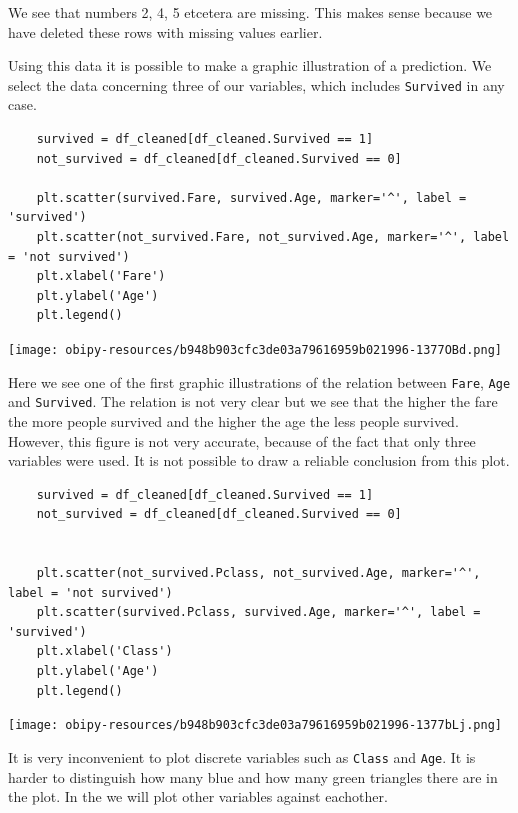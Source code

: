 \documentclass[11pt]{article}
\begin{document}
We see that numbers 2, 4, 5 etcetera are missing. This makes sense because we have deleted these rows with missing values earlier. 

Using this data it is possible to make a graphic illustration of a prediction. We select the data concerning three of our variables, which includes \texttt{Survived} in any case. 


\begin{verbatim}
    survived = df_cleaned[df_cleaned.Survived == 1]
    not_survived = df_cleaned[df_cleaned.Survived == 0]

    plt.scatter(survived.Fare, survived.Age, marker='^', label = 'survived')
    plt.scatter(not_survived.Fare, not_survived.Age, marker='^', label = 'not survived')
    plt.xlabel('Fare')
    plt.ylabel('Age')
    plt.legend()
\end{verbatim}

\begin{center}
\texttt{[image: obipy-resources/b948b903cfc3de03a79616959b021996-1377OBd.png]}
\end{center}

Here we see one of the first graphic illustrations of the relation between \texttt{Fare}, \texttt{Age}
and \texttt{Survived}. The relation is not very clear but we see that the higher the fare the more people survived and the higher the age the less people survived. However, this figure is not very accurate, because of the fact that only three variables were used. It is not possible to draw a reliable conclusion from this plot.



\begin{verbatim}
    survived = df_cleaned[df_cleaned.Survived == 1]
    not_survived = df_cleaned[df_cleaned.Survived == 0]


    plt.scatter(not_survived.Pclass, not_survived.Age, marker='^', label = 'not survived')
    plt.scatter(survived.Pclass, survived.Age, marker='^', label = 'survived')
    plt.xlabel('Class')
    plt.ylabel('Age')
    plt.legend()
\end{verbatim}

\begin{center}
\texttt{[image: obipy-resources/b948b903cfc3de03a79616959b021996-1377bLj.png]}
\end{center}


It is very inconvenient to plot discrete variables such as \texttt{Class} and \texttt{Age}. It is harder to distinguish how many blue and how many green triangles there are in the plot. In the we will plot other variables against eachother. 
\end{document}
